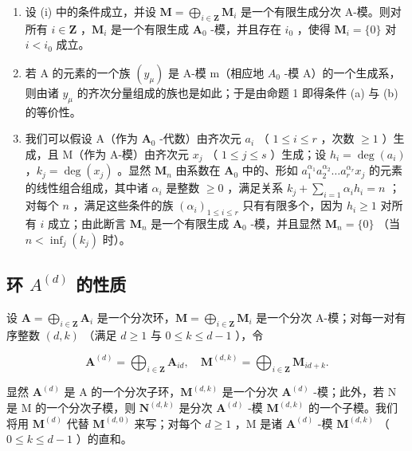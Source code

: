 \begin{enumerate}
\def\labelenumi{(\roman{enumi})}
\setcounter{enumi}{1}
\item
  设 (i) 中的条件成立，并设 \(\mathbf{M} = \bigoplus_{i\in \mathbf{Z}}\mathbf{M}_i\) 是一个有限生成分次 A-模。则对所有 \(i\in \mathbf{Z}\) ，\(\mathbf{M}_i\) 是一个有限生成 \(\mathbf{A}_0\) -模，并且存在 \(i_0\) ，使得 \(\mathbf{M}_i = \{0\}\) 对 \(i < i_0\) 成立。
\item
  若 A 的元素的一个族 \((y_{\mu})\) 是 A-模 m（相应地 \(A_{0}\) -模 A）的一个生成系，则由诸 \(y_{\mu}\) 的齐次分量组成的族也是如此；于是由命题 1 即得条件 (a) 与 (b) 的等价性。
\item
  我们可以假设 A（作为 \(\mathbf{A}_0\) -代数）由齐次元 \(a_i\) （ \(1 \leqslant i \leqslant r\) ，次数 \(\geqslant 1\) ）生成，且 M（作为 A-模）由齐次元 \(x_j\) （ \(1 \leqslant j \leqslant s\) ）生成；设 \(h_i = \deg(a_i)\) ，\(k_j = \deg(x_j)\) 。显然 \(\mathbf{M}_n\) 由系数在 \(\mathbf{A}_0\) 中的、形如 \(a_1^{\alpha_1} a_2^{\alpha_2} \ldots a_r^{\alpha_r} x_j\) 的元素的线性组合组成，其中诸 \(\alpha_i\) 是整数 \(\geqslant 0\) ，满足关系 \(k_j + \sum_{i=1} \alpha_i h_i = n\) ；对每个 \(n\) ，满足这些条件的族 \((\alpha_i)_{1 \leqslant i \leqslant r}\) 只有有限多个，因为 \(h_i \geqslant 1\) 对所有 \(i\) 成立；由此断言 \(\mathbf{M}_n\) 是一个有限生成 \(\mathbf{A}_0\) -模，并且显然 \(\mathbf{M}_n = \{0\}\) （当 \(n < \inf_{j}(k_j)\) 时）。
\end{enumerate}

\subsection{\texorpdfstring{环 \(A^{(d)}\) 的性质}{环 A(d) 的性质}}

设 \(\mathbf{A} = \bigoplus_{i\in \mathbf{Z}}\mathbf{A}_i\) 是一个分次环，\(\mathbf{M} = \bigoplus_{i\in \mathbf{Z}}\mathbf{M}_i\) 是一个分次 A-模；对每一对有序整数 \((d, k)\) （满足 \(d \geqslant 1\) 与 \(0 \leqslant k \leqslant d - 1\) ），令

\[
\mathbf {A} ^ {(d)} = \bigoplus_ {i \in \mathbf {Z}} \mathbf {A} _ {i d}, \quad \mathbf {M} ^ {(d, k)} = \bigoplus_ {i \in \mathbf {Z}} \mathbf {M} _ {i d + k}.
\]

显然 \(\mathbf{A}^{(d)}\) 是 A 的一个分次子环，\(\mathbf{M}^{(d,k)}\) 是一个分次 \(\mathbf{A}^{(d)}\) -模；此外，若 N 是 M 的一个分次子模，则 \(\mathbf{N}^{(d,k)}\) 是分次 \(\mathbf{A}^{(d)}\) -模 \(\mathbf{M}^{(d,k)}\) 的一个子模。我们将用 \(\mathbf{M}^{(d)}\) 代替 \(\mathbf{M}^{(d,0)}\) 来写；对每个 \(d \geqslant 1\) ，M 是诸 \(\mathbf{A}^{(d)}\) -模 \(\mathbf{M}^{(d,k)}\) （ \(0 \leqslant k \leqslant d - 1\) ）的直和。

